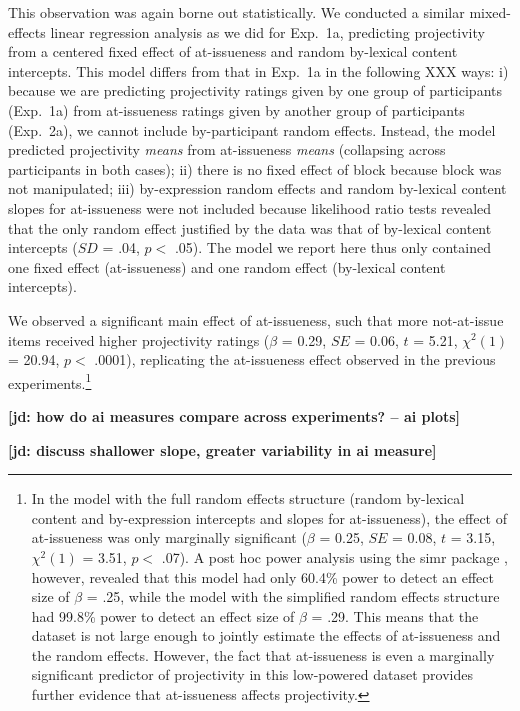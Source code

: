 \documentclass[11pt,fleqn]{article}
\newcommand{\6}{\mbox{$[\hspace*{-.6mm}[$}}
\newcommand{\9}{\mbox{$]\hspace*{-.6mm}]$}}
\newcommand{\jd}[1]{\textbf{\color{Green}[jd: #1]}}
\begin{document}
This observation was again borne out statistically. We conducted a similar mixed-effects linear regression analysis as we did for Exp.~1a, predicting projectivity from a centered fixed effect of at-issueness and random by-lexical content intercepts. This model differs from that in Exp.~1a in the following XXX ways: i) because we are predicting projectivity ratings given by one group of participants (Exp.~1a) from at-issueness ratings given by another group of participants (Exp.~2a), we cannot include by-participant random effects. Instead, the model predicted projectivity \emph{means}  from  at-issueness \emph{means} (collapsing across participants in both cases); ii) there is no fixed effect of block because block was not manipulated; iii) by-expression random effects and random by-lexical content slopes for at-issueness were not included because likelihood ratio tests revealed that the only random effect justified by the data was that of by-lexical content intercepts ($SD$ = .04, $p < $ .05). The model we report here thus only contained one fixed effect (at-issueness) and one random effect (by-lexical content intercepts).

We observed a significant main effect of at-issueness, such that more not-at-issue items received higher projectivity ratings ($\beta$ = 0.29, $SE$ = 0.06, $t$ = 5.21, $\chi^2(1)$ = 20.94, $p <$ .0001), replicating the at-issueness effect observed in the previous experiments.\footnote{In the model with the full random effects structure (random by-lexical content and by-expression intercepts and slopes for at-issueness), the effect of at-issueness was only marginally significant ($\beta$ = 0.25, $SE$ = 0.08, $t$ = 3.15, $\chi^2(1)$ = 3.51, $p <$ .07).  A post hoc power analysis using the simr package \citep{simr}, however, revealed that this model had only 60.4\% power to detect an effect size of $\beta$ = .25, while the model with the simplified random effects structure had 99.8\% power to detect an effect size of $\beta$ = .29. This means that the dataset is not large enough to jointly estimate the effects of at-issueness and the random effects. However, the fact that at-issueness is even a marginally significant predictor of projectivity in this low-powered dataset provides further evidence that at-issueness affects projectivity.}


\jd{how do ai measures compare across experiments? -- ai plots}

\jd{discuss shallower slope, greater variability in ai measure}
\end{document}
